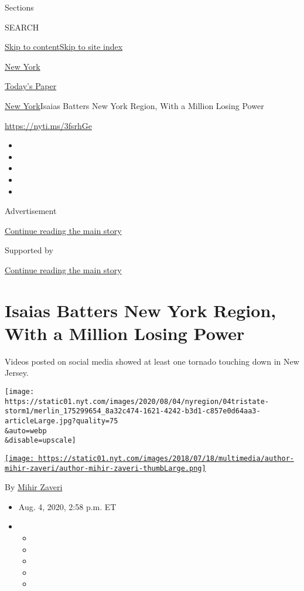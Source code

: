 Sections

SEARCH

\protect\hyperlink{site-content}{Skip to
content}\protect\hyperlink{site-index}{Skip to site index}

\href{https://www.nytimes.com/section/nyregion}{New York}

\href{https://myaccount.nytimes.com/auth/login?response_type=cookie\&client_id=vi}{}

\href{https://www.nytimes.com/section/todayspaper}{Today's Paper}

\href{/section/nyregion}{New York}\textbar{}Isaias Batters New York
Region, With a Million Losing Power

\url{https://nyti.ms/3fsrhGe}

\begin{itemize}
\item
\item
\item
\item
\item
\end{itemize}

Advertisement

\protect\hyperlink{after-top}{Continue reading the main story}

Supported by

\protect\hyperlink{after-sponsor}{Continue reading the main story}

\hypertarget{isaias-batters-new-york-region-with-a-million-losing-power}{%
\section{Isaias Batters New York Region, With a Million Losing
Power}\label{isaias-batters-new-york-region-with-a-million-losing-power}}

Videos posted on social media showed at least one tornado touching down
in New Jersey.

\texttt{[image: https://static01.nyt.com/images/2020/08/04/nyregion/04tristate-storm1/merlin\_175299654\_8a32c474-1621-4242-b3d1-c857e0d64aa3-articleLarge.jpg?quality=75\\\&auto=webp\\\&disable=upscale]}

\href{https://www.nytimes.com/by/mihir-zaveri}{\texttt{[image: https://static01.nyt.com/images/2018/07/18/multimedia/author-mihir-zaveri/author-mihir-zaveri-thumbLarge.png]}}

By \href{https://www.nytimes.com/by/mihir-zaveri}{Mihir Zaveri}

\begin{itemize}
\item
  Aug. 4, 2020, 2:58 p.m. ET
\item
  \begin{itemize}
  \item
  \item
  \item
  \item
  \item
  \end{itemize}
\end{itemize}

